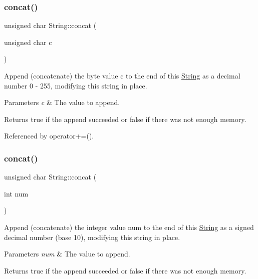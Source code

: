 \subsubsection{\texorpdfstring{concat()}{concat()}\hspace{0.1cm}{\footnotesize\ttfamily [5/12]}}
{\footnotesize\ttfamily unsigned char String\+::concat (\begin{DoxyParamCaption}\item[{unsigned char}]{c }\end{DoxyParamCaption})}



Append (concatenate) the byte value c to the end of this \hyperlink{class_string}{String} as a decimal number 0 -\/ 255, modifying this string in place. 


\begin{DoxyParams}{Parameters}
{\em c} & The value to append.\\
\hline
\end{DoxyParams}
\begin{DoxyReturn}{Returns}
true if the append succeeded or false if there was not enough memory. 
\end{DoxyReturn}


Referenced by operator+=().

\mbox{\label{class_string_a6d437a7312b591848b5457705fee5549}} 
\subsubsection{\texorpdfstring{concat()}{concat()}\hspace{0.1cm}{\footnotesize\ttfamily [6/12]}}
{\footnotesize\ttfamily unsigned char String\+::concat (\begin{DoxyParamCaption}\item[{int}]{num }\end{DoxyParamCaption})}



Append (concatenate) the integer value num to the end of this \hyperlink{class_string}{String} as a signed decimal number (base 10), modifying this string in place. 


\begin{DoxyParams}{Parameters}
{\em num} & The value to append.\\
\hline
\end{DoxyParams}
\begin{DoxyReturn}{Returns}
true if the append succeeded or false if there was not enough memory. 
\end{DoxyReturn}


